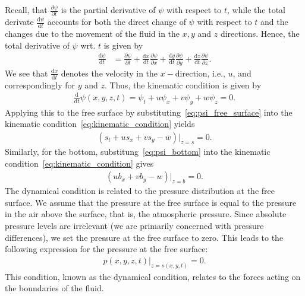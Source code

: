 Recall, that $\frac{\partial \psi}{\partial t}$ is the partial derivative of $\psi$ with respect to $t$, while the total derivate $\frac{\text{d} \psi}{\text{d} t}$ accounts for both the direct change of $\psi$ with respect to $t$ and the changes due to the movement of the fluid in the $x, y$ and $z$ directions.
Hence, the total derivative of $\psi$ wrt. $t$ is given by
\begin{align*}
    \frac{\text{d} \psi}{\text{d} t} &= \frac{\partial \psi}{\partial t} + \frac{\text{d} x}{\text{d} t} \frac{\partial \psi}{\partial x} + \frac{\text{d} y}{\text{d} t}  \frac{\partial \psi}{\partial y} + \frac{\text{d} z}{\text{d} t}  \frac{\partial \psi}{\partial z}.
\end{align*}
We see that $\frac{\text{d}x}{\text{d}t}$ denotes the velocity in the $x-$direction, i.e., $u$, and correspondingly for $y$ and $z$.
Thus, the kinematic condition is given by
\begin{align}\label{eq:kinematic_condition}
    \frac{\text{d} }{\text{d} t} \psi(x,y,z,t) = \psi_t + u \psi_x + v \psi_y + w \psi_z = 0.
\end{align}
Applying this to the free surface by substituting~\eqref{eq:psi_free_surface} into the kinematic condition~\eqref{eq:kinematic_condition} yields
\begin{align}\label{eq:kinematic_condition_free_surface}
    (s_t + u s_x + v s_y - w)|_{z=s} = 0.
\end{align}
Similarly, for the bottom, substitung~\eqref{eq:psi_bottom} into the kinematic condition~\eqref{eq:kinematic_condition} gives
\begin{align}\label{eq:kinematic_condition_bottom}
    (u b_x + v b_y - w)|_{z=b} = 0.
\end{align}
The dynamical condition is related to the pressure distribution at the free surface.
We assume that the pressure at the free surface is equal to the pressure in the air above the surface, that is, the atmospheric pressure.
Since absolute pressure levels are irrelevant (we are primarily concerned with pressure differences), we set the pressure at the free surface to zero.
This leads to the following expression for the pressure at the free surface:
\begin{align}\label{eq:pressure_free_surface}
    p(x,y,z,t)|_{z = s(x,y,t)} = 0.
\end{align}
This condition, known as the dynamical condition, relates to the forces acting on the boundaries of the fluid.

